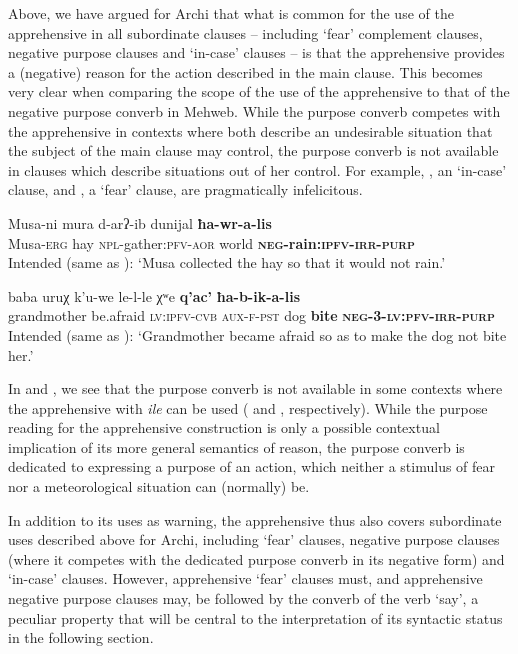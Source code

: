 \documentclass[output=paper,colorlinks,citecolor=brown]{langscibook}
\begin{document}
 Above, we have argued for Archi that what is common for the use of the apprehensive in all subordinate clauses -- including `fear' complement clauses, negative purpose clauses and `in-case' clauses -- is that the apprehensive provides a (negative) reason for the action described in the main clause. This becomes very clear when comparing the scope of the use of the apprehensive to that of the negative purpose converb in Mehweb. While the purpose converb competes with the apprehensive in  contexts where both describe an undesirable situation that the subject of the main clause may control, the purpose converb is not available in  clauses which describe situations out of her control. For example,  , an `in-case' clause, and  , a `fear' clause, are pragmatically infelicitous.

\ea \label{ex:DD48}
\gll *Musa-ni mura d-arʔ-ib dunijal \textbf{ħa-wr-a-lis} \\
Musa-\textsc{erg} hay \textsc{npl}-gather:\textsc{pfv-aor} world \textbf{\textsc{neg}-rain:\textsc{ipfv-irr-purp}} \\
\glt Intended (same as ):
 `Musa collected the hay so that it would not rain.'
\z


\ea \label{ex:DD49}
\gll *baba uruχ k'u-we le-l-le χʷe \textbf{q'ac'} \textbf{ħa-b-ik-a-lis} \\
grandmother be.afraid \textsc{lv:ipfv-cvb} \textsc{aux-f-pst} dog \textbf{bite} \textbf{\textsc{neg-3-lv:pfv-irr-purp}} \\
\glt Intended (same as ):  `Grandmother became afraid so as to make the dog not bite her.'
\z


\noindent In  and , we see that the purpose converb is not available in some contexts where the apprehensive with \textit{ile} can be used ( and , respectively). While the purpose reading for the apprehensive construction is only a possible contextual implication of its more general semantics of reason, the purpose converb is dedicated to expressing a purpose of an action, which neither a stimulus of fear nor a meteorological situation can (normally) be.

In addition to its uses as warning, the apprehensive thus also covers subordinate uses described above for Archi, including `fear' clauses, negative purpose clauses (where it competes with the dedicated purpose converb in its negative form) and `in-case' clauses. However, apprehensive `fear' clauses must, and apprehensive negative purpose clauses may, be followed by the converb of the verb `say', a peculiar property that will be central to the interpretation of its syntactic status in the following section.
\end{document}
